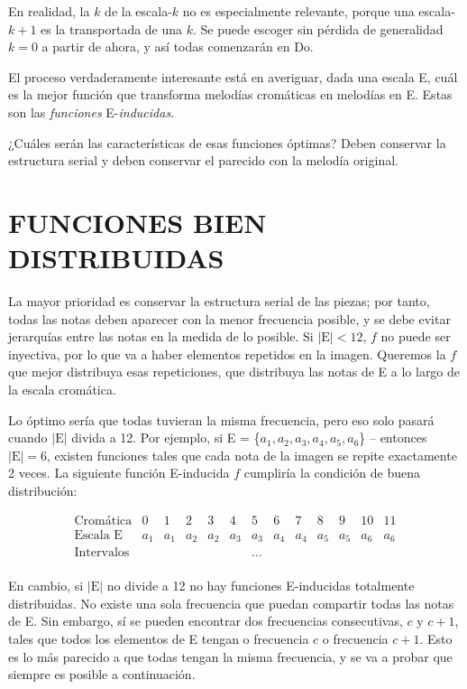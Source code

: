 		En realidad, la $k$ de la escala-$k$ no es especialmente relevante, porque una escala-$k+1$ es la transportada de una $k$. Se puede escoger sin pérdida de generalidad $k=0$ a partir de ahora, y así todas comenzarán en Do.
		
		El proceso verdaderamente interesante está en averiguar, dada una escala E, cuál es la mejor función que transforma melodías cromáticas en melodías en E. Estas son las \textit{funciones} E-\textit{inducidas}.
		
		¿Cuáles serán las características de esas funciones óptimas? Deben conservar la estructura serial y deben conservar el parecido con la melodía original.
		
	\section{FUNCIONES BIEN DISTRIBUIDAS}
		
		La mayor prioridad es conservar la estructura serial de las piezas; por tanto, todas las notas deben aparecer con la menor frecuencia posible, y se debe evitar jerarquías entre las notas en la medida de lo posible. Si $|\text{E}|<12$, $f$ no puede ser inyectiva, por lo que va a haber elementos repetidos en la imagen. Queremos la $f$ que mejor distribuya esas repeticiones, que distribuya las notas de E a lo largo de la escala cromática.
		
		Lo óptimo sería que todas tuvieran la misma frecuencia, pero eso solo pasará cuando $|\text{E}|$ divida a 12. Por ejemplo, si E = \{$a_1,a_2,a_3,a_4,a_5,a_6$\} -- entonces $|\text{E}|=6$, existen funciones tales que cada nota de la imagen se repite exactamente 2 veces. La siguiente función E-inducida $f$ cumpliría la condición de buena distribución:
				
		$$\left.\begin{matrix}
		\text{Cromática}&0&1&2&3&4&5&6&7&8&9&10&11\\
		\text{Escala E}&a_1&a_1&a_2&a_2&a_3&a_3&a_4&a_4&a_5&a_5&a_6&a_6\\
		\text{Intervalos}&&&&&&\ldots\\
		\end{matrix}\right.$$
		
		En cambio, si $|\text{E}|$ no divide a 12 no hay funciones E-inducidas totalmente distribuidas. No existe una sola frecuencia que puedan compartir todas las notas de E. Sin embargo, sí se pueden encontrar dos frecuencias consecutivas, $c$ y $c+1$, tales que todos los elementos de E tengan o frecuencia $c$ o frecuencia $c+1$. Esto es lo más parecido a que todas tengan la misma frecuencia, y se va a probar que siempre es posible a continuación. 
		
